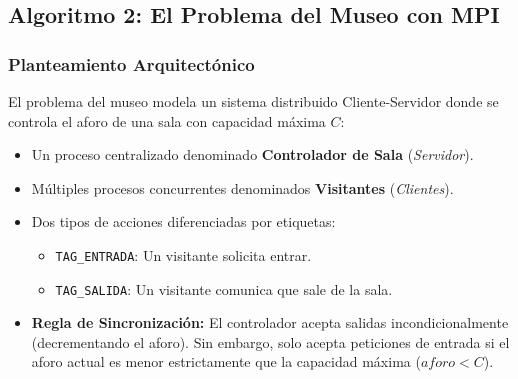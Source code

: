 \subsection{Algoritmo 2: El Problema del Museo con MPI}

\subsubsection{Planteamiento Arquitectónico}
El problema del museo modela un sistema distribuido Cliente-Servidor donde se controla el aforo de una sala con capacidad máxima $C$:
\begin{itemize}[leftmargin=*]
    \item Un proceso centralizado denominado \textbf{Controlador de Sala} (\emph{Servidor}).
    \item Múltiples procesos concurrentes denominados \textbf{Visitantes} (\emph{Clientes}).
    \item Dos tipos de acciones diferenciadas por etiquetas:
    \begin{itemize}
        \item \texttt{TAG\_ENTRADA}: Un visitante solicita entrar.
        \item \texttt{TAG\_SALIDA}: Un visitante comunica que sale de la sala.
    \end{itemize}
    \item \textbf{Regla de Sincronización:} El controlador acepta salidas incondicionalmente (decrementando el aforo). Sin embargo, solo acepta peticiones de entrada si el aforo actual es menor estrictamente que la capacidad máxima ($aforo < C$).
\end{itemize}

